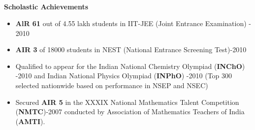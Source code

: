 \documentclass[a4paper,10pt]{article}
\newcommand{\resheading}[1]{{\small \colorbox{mygrey}{\begin{minipage}{0.975\textwidth}{\textbf{#1 \vphantom{p\^{E}}}}\end{minipage}}}}
\begin{document}
\hspace{0.5cm}\\
\hspace{0.5cm}\\
\hspace{0.5cm}\\
\hspace{0.5cm}\\
\hspace{0.5cm}\\
\hspace{0.5cm}\\ 
\hspace{0.5cm}\\
\hspace{0.5cm}\\
\hspace{0.5cm}\\[-0.2cm]

\resheading{\textbf{\large Scholastic Achievements}}
\begin{itemize}
  \item \textbf{AlR 61} out of 4.55 lakh students in IIT-JEE (Joint Entrance Examination) - 2010 \\[-0.7cm]
  
  \item \textbf{AIR 3} of 18000 students in NEST (National Entrance Screening Test)-2010  \\[-0.7cm]%

 \item Qualified to appear for the Indian National Chemistry Olympiad (\textbf{INChO}) -2010 and Indian National Physics Olympiad (\textbf{INPhO}) -2010 (Top 300 selected nationwide based on performance in NSEP and NSEC)\\[-0.7cm]
  
 \item Secured \textbf{AIR 5} in the  XXXIX National Mathematics Talent Competition (\textbf{NMTC})-2007 conducted by Association of Mathematics Teachers of India (\textbf{AMTI}).\\[-0.7cm]
  \\
\end{itemize}
\end{document}
